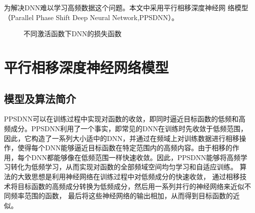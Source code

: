 为解决DNN难以学习高频数据这个问题。本文中采用平行相移深度神经网
络模型\cite{cai2019phasednn}（Parallel Phase Shift Deep Neural Network,PPSDNN）。
\begin{figure}[htbp!]
    \centering
    \hspace{0.5in} %
    \caption{不同激活函数下DNN的损失函数}
    \label{fig:u235fploss}
  \end{figure}


\section{平行相移深度神经网络模型}

\subsection{模型及算法简介}
PPSDNN可以在训练过程中实现对函数的收敛，即同时逼近目标函数的低频和高频成分。PPSDNN利用了一个事实，即常见的DNN在训练时先收敛于低频范围，因此，它构造了一系列大小适中的DNN，并通过在频域上对训练数据进行相移操作，使得每个DNN能够逼近目标函数在特定范围内的高频内容。由于相移的作用，每个DNN都能够像在低频范围一样快速收敛。因此，PPSDNN能够将高频学习转化为低频学习，从而实现对函数的全部频域空间均匀学习和自适应训练。\cite{daubechies1992ten}
算法的大致思想是利用神经网络在训练过程中对低频成分的快速收敛，
通过相移技术将目标函数的高频成分转换为低频成分，然后用一系列并行的神经网络来近似不同频率范围的函数，
最后将这些神经网络的输出相加，从而得到目标函数的近似。

